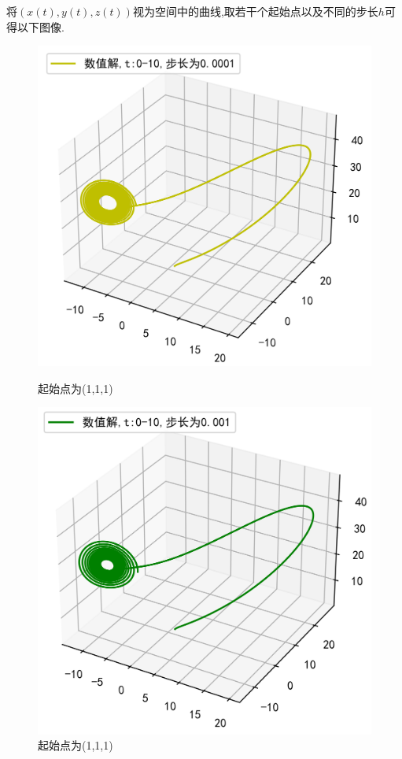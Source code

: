 \documentclass[a4paper]{article}%
\begin{document}
将$(x(t),y(t),z(t))$视为空间中的曲线,取若干个起始点以及不同的步长$h$可得以下图像.
\begin{figure}[h]
    \begin{minipage}{0.48\linewidth}
    \centering
    \includegraphics[scale=0.65]{11}
    \caption{起始点为(1,1,1)}
    \end{minipage}
    \begin{minipage}{0.48\linewidth}
    \centering
    \includegraphics[scale=0.65]{12}
    \caption{起始点为(1,1,1)}
    \end{minipage}
\end{figure}
\end{document}
